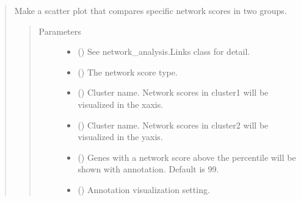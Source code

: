 \documentclass[letterpaper,10pt,english]{sphinxmanual}
\begin{document}
\begin{quote}
\begin{fulllineitems}
\begin{fulllineitems}
\label{\detokenize{modules/celloracle.network_analysis:celloracle.network_analysis.Links.plot_score_comparison_2D}}
Make a scatter plot that compares specific network scores in two groups.
\begin{quote}\begin{description}
\item[{Parameters}] \leavevmode\begin{itemize}
\item {} 
 ({\hyperref[\detokenize{modules/celloracle:celloracle.Links}]{}}) \textendash{} See network\_analysis.Links class for detail.

\item {} 
 () \textendash{} The network score type.

\item {} 
 () \textendash{} Cluster name. Network scores in cluster1 will be visualized in the x\sphinxhyphen{}axis.

\item {} 
 () \textendash{} Cluster name. Network scores in cluster2 will be visualized in the y\sphinxhyphen{}axis.

\item {} 
 () \textendash{} Genes with a network score above the percentile will be shown with annotation. Default is 99.

\item {} 
 (\sphinxstyleliteralemphasis{\sphinxupquote{(}}\sphinxstyleliteralemphasis{\sphinxupquote{, }}\sphinxstyleliteralemphasis{\sphinxupquote{)}}) \textendash{} Annotation visualization setting.


\end{itemize}
\end{description}
\end{quote}
\end{fulllineitems}
\end{fulllineitems}
\end{quote}
\end{document}
